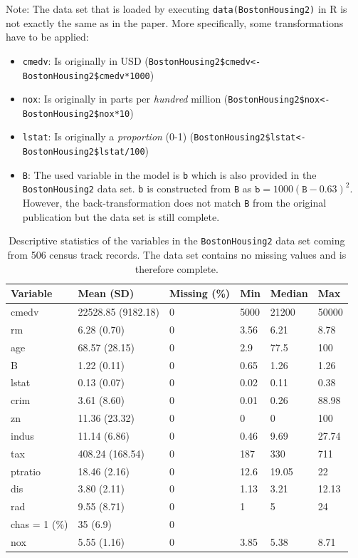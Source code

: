 \documentclass[11pt,a4paper,twoside]{book}\usepackage[]{graphicx}\usepackage[]{xcolor}
\begin{document}
Note: The data set that is loaded by executing \texttt{data(BostonHousing2)} in \textsf{R} is not exactly the same as in the paper. More specifically, some transformations have to be applied:
\begin{itemize}
\item \texttt{cmedv}: Is originally in USD (\texttt{BostonHousing2\$cmedv<-BostonHousing2\$cmedv*1000})
\item \texttt{nox}: Is originally in parts per \textit{hundred} million (\texttt{BostonHousing2\$nox<-BostonHousing2\$nox*10})
\item \texttt{lstat}: Is originally a \textit{proportion}  (0-1) (\texttt{BostonHousing2\$lstat<-BostonHousing2\$lstat/100})
\item \texttt{B}: The used variable in the model is \texttt{b} which is also provided in the \texttt{BostonHousing2} data set. \texttt{b} is constructed from \texttt{B} as $\texttt{b}=1000(\texttt{B}-0.63)^2$. However, the back-transformation does not match \texttt{B} from the original publication but the data set is still complete.
\end{itemize}



\begin{table}[H]\begin{center}
\caption{Descriptive statistics of the variables in the \texttt{BostonHousing2} data set coming from 506 census track records. The data set contains no missing values and is therefore complete.}\label{tab:to_boston}
\begingroup\footnotesize
\begin{tabular}{llllll}
  \toprule
Variable & Mean (SD) & Missing (\%) & Min & Median & Max \\ 
  \midrule
cmedv & 22528.85 (9182.18) & 0 & 5000 & 21200 & 50000 \\ 
  rm & 6.28 (0.70) & 0 & 3.56 & 6.21 & 8.78 \\ 
  age & 68.57 (28.15) & 0 & 2.9 & 77.5 & 100 \\ 
  B & 1.22 (0.11) & 0 & 0.65 & 1.26 & 1.26 \\ 
  lstat & 0.13 (0.07) & 0 & 0.02 & 0.11 & 0.38 \\ 
  crim & 3.61 (8.60) & 0 & 0.01 & 0.26 & 88.98 \\ 
  zn & 11.36 (23.32) & 0 & 0 & 0 & 100 \\ 
  indus & 11.14 (6.86) & 0 & 0.46 & 9.69 & 27.74 \\ 
  tax & 408.24 (168.54) & 0 & 187 & 330 & 711 \\ 
  ptratio & 18.46 (2.16) & 0 & 12.6 & 19.05 & 22 \\ 
  dis & 3.80 (2.11) & 0 & 1.13 & 3.21 & 12.13 \\ 
  rad & 9.55 (8.71) & 0 & 1 & 5 & 24 \\ 
  chas = 1 (\%) & 35 (6.9) & 0 &  &  &  \\ 
  nox & 5.55 (1.16) & 0 & 3.85 & 5.38 & 8.71 \\ 
   \bottomrule
\end{tabular}
\endgroup

\end{center}\end{table}
\end{document}
